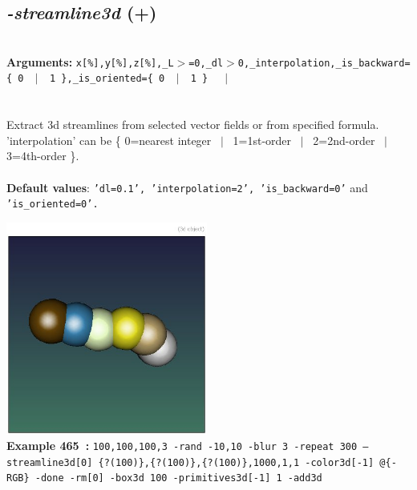 \documentclass[a4paper,11pt,twoside]{book}
\begin{document}
\subsection{\emph{-streamline3d} (+)}\vspace*{-0.5em}
~\\\textbf{Arguments: } 
{\small \texttt{x[\%],y[\%],z[\%],\_L$>$=0,\_dl$>$0,\_interpolation,\_is\_backward=\{ 0 ~$|$~ 1 \},\_is\_oriented=\{ 0 ~$|$~ 1 \}}}~~~$|$\\
\\~\\
Extract 3d streamlines from selected vector fields or from specified formula.
~\\'interpolation' can be \{ 0=nearest integer ~$|$~ 1=1st-order ~$|$~ 2=2nd-order ~$|$~ 3=4th-order \}.
~\\~\\\textbf{Default values}: {\small \texttt{'dl=0.1', 'interpolation=2', 'is\_backward=0'} and \texttt{'is\_oriented=0'.}}
\begin{center}\includegraphics[keepaspectratio=true,height=7cm,width=\textwidth]{img/gmic_def465.jpg}\\
{\footnotesize \textbf{Example 465~:} \texttt{100,100,100,3 -rand -10,10 -blur 3 -repeat 300 --streamline3d[0] \{?(100)\},\{?(100)\},\{?(100)\},1000,1,1 -color3d[-1] @\{-RGB\} -done -rm[0] -box3d 100 -primitives3d[-1] 1 -add3d}}
\end{center}
\end{document}
